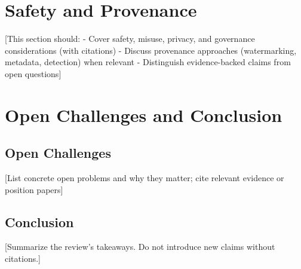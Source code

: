 \documentclass[conference]{IEEEtran}
\begin{document}
\section{Safety and Provenance}
[This section should:
- Cover safety, misuse, privacy, and governance considerations (with citations)
- Discuss provenance approaches (watermarking, metadata, detection) when relevant
- Distinguish evidence-backed claims from open questions]

\section{Open Challenges and Conclusion}
\subsection{Open Challenges}
[List concrete open problems and why they matter; cite relevant evidence or position papers]

\subsection{Conclusion}
[Summarize the review's takeaways. Do not introduce new claims without citations.]

\label{ReferencesStart}
  
\end{document}
